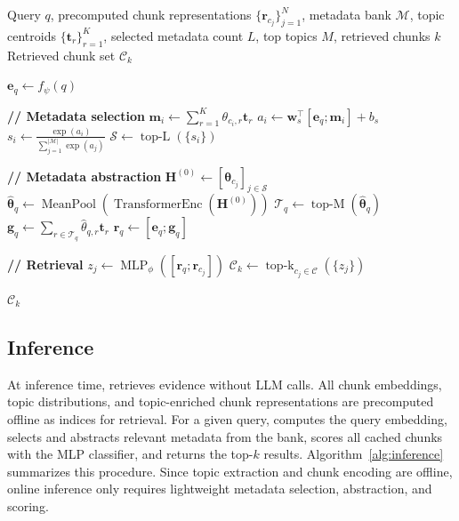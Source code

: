 \begin{algorithm}[t]
\caption{\name{} Inference}
\label{alg:inference}
\begin{algorithmic}[1]
\REQUIRE Query $q$, precomputed chunk representations $\{\mathbf{r}_{c_j}\}_{j=1}^{N}$, metadata bank $\mathcal{M}$, topic centroids $\{\mathbf{t}_r\}_{r=1}^{K}$, selected metadata count $L$, top topics $M$, retrieved chunks $k$
\ENSURE Retrieved chunk set $\mathcal{C}_k$

\STATE $\mathbf{e}_q \leftarrow f_{\psi}(q)$

\STATE \textbf{// Metadata selection}
    \STATE $\mathbf{m}_i \leftarrow \sum_{r=1}^{K} \theta_{c_i,r}\mathbf{t}_r$
    \STATE $a_i \leftarrow \mathbf{w}_s^\top [\mathbf{e}_q ; \mathbf{m}_i] + b_s$
\ENDFOR
\STATE $s_i \leftarrow \frac{\exp(a_i)}{\sum_{j=1}^{|\mathcal{M}|}\exp(a_j)}$
\STATE $\mathcal{S} \leftarrow \operatorname{top\text{-}L}(\{s_i\})$

\STATE \textbf{// Metadata abstraction}
\STATE $\mathbf{H}^{(0)} \leftarrow [\boldsymbol{\theta}_{c_j}]_{j \in \mathcal{S}}$
\STATE $\hat{\boldsymbol{\theta}}_q \leftarrow \operatorname{MeanPool}(\operatorname{TransformerEnc}(\mathbf{H}^{(0)}))$
\STATE $\mathcal{T}_q \leftarrow \operatorname{top\text{-}M}(\hat{\boldsymbol{\theta}}_q)$
\STATE $\mathbf{g}_q \leftarrow \sum_{r \in \mathcal{T}_q} \hat{\theta}_{q,r}\mathbf{t}_r$
\STATE $\mathbf{r}_q \leftarrow [\mathbf{e}_q;\mathbf{g}_q]$

\STATE \textbf{// Retrieval}
    \STATE $z_j \leftarrow \operatorname{MLP}_{\phi}([\mathbf{r}_q ; \mathbf{r}_{c_j}])$
\ENDFOR
\STATE $\mathcal{C}_k \leftarrow \operatorname{top\text{-}k}_{c_j \in \mathcal{C}}(\{z_j\})$

\RETURN $\mathcal{C}_k$
\end{algorithmic}
\end{algorithm}

\subsection{Inference}
\label{sec:inference}

At inference time, \name{} retrieves evidence without LLM calls. All chunk embeddings, topic distributions, and topic-enriched chunk representations are precomputed offline as indices for retrieval. For a given query, \name{} computes the query embedding, selects and abstracts relevant metadata from the bank, scores all cached chunks with the MLP classifier, and returns the top-$k$ results. Algorithm~\ref{alg:inference} summarizes this procedure. Since topic extraction and chunk encoding are offline, online inference only requires lightweight metadata selection, abstraction, and scoring.
